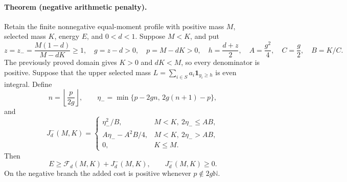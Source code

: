 \paragraph{Theorem (negative arithmetic penalty).}
Retain the finite nonnegative equal-moment profile with positive mass \(M\),
selected mass \(K\), energy \(E\), and \(0<d<1\).  Suppose \(M<K\), and put
\[
 z=z_- =\frac{M(1-d)}{M-dK}\ge1,\quad g=z-d>0,\quad
 p=M-dK>0,\quad h=\frac{d+z}{2},\quad A=\frac{g^2}{4},\quad C=\frac g2,\quad B=K/C.
\]
The previously proved domain gives \(K>0\) and \(dK<M\), so every denominator
is positive.  Suppose that the upper selected mass
\(L=\sum_{i\in S}a_i\mathbf1_{y_i\ge h}\) is even integral.  Define
\[
 n=\left\lfloor\frac p{2g}\right\rfloor,\qquad
 \eta_- =\min\{p-2gn,\,2g(n+1)-p\},
\]
and
\begin{equation}
 J^-_d(M,K)=
 \begin{cases}
 \eta_-^2/B,&M<K,\ 2\eta_-\le AB,\\
 A\eta_--A^2B/4,&M<K,\ 2\eta_->AB,\\
 0,&K\le M.
 \end{cases}
 \label{eq:negative-integer-cost}
\end{equation}
Then
\begin{equation}
 E\ge\mathcal F_d(M,K)+J^-_d(M,K),\qquad J^-_d(M,K)\ge0.
 \label{eq:negative-integer-energy}
\end{equation}
On the negative branch the added cost is positive whenever
\(p\notin2g\mathbb N\).

